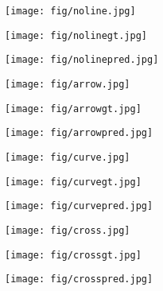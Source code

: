 \documentclass[conference]{IEEEtran}
\begin{document}
\begin{figure}
     \begin{subfigure}[b]{0.32\linewidth}
         \centering
         \texttt{[image: fig/noline.jpg]}
\end{subfigure}\begin{subfigure}[b]{0.32\linewidth}
         \centering
         \texttt{[image: fig/nolinegt.jpg]}
\end{subfigure}\begin{subfigure}[b]{0.32\linewidth}
         \centering
         \texttt{[image: fig/nolinepred.jpg]}
\end{subfigure}\vspace{.3ex}
     
     \begin{subfigure}[b]{0.32\linewidth}
         \centering
         \texttt{[image: fig/arrow.jpg]}
\end{subfigure}\begin{subfigure}[b]{0.32\linewidth}
         \centering
         \texttt{[image: fig/arrowgt.jpg]}
\end{subfigure}\begin{subfigure}[b]{0.32\linewidth}
         \centering
         \texttt{[image: fig/arrowpred.jpg]}
\end{subfigure}\vspace{.3ex}

     \begin{subfigure}[b]{0.32\linewidth}
         \centering
         \texttt{[image: fig/curve.jpg]}
\end{subfigure}\begin{subfigure}[b]{0.32\linewidth}
         \centering
         \texttt{[image: fig/curvegt.jpg]}
\end{subfigure}\begin{subfigure}[b]{0.32\linewidth}
         \centering
         \texttt{[image: fig/curvepred.jpg]}
\end{subfigure}\vspace{.3ex}

     \begin{subfigure}[b]{0.32\linewidth}
         \centering
         \texttt{[image: fig/cross.jpg]}
\end{subfigure}\begin{subfigure}[b]{0.32\linewidth}
         \centering
         \texttt{[image: fig/crossgt.jpg]}
\end{subfigure}\begin{subfigure}[b]{0.32\linewidth}
         \centering
         \texttt{[image: fig/crosspred.jpg]}
\end{subfigure}\vspace{.3ex}
     

\end{figure}
\end{document}
